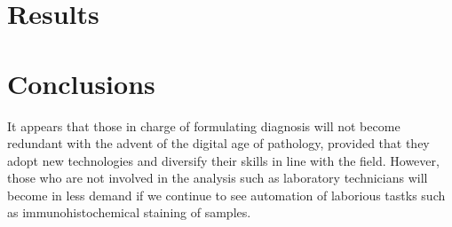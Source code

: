 \documentclass[12pt]{article}
\begin{document}
\section{Results}\label{results}

\section{Conclusions}\label{conclusions}

It appears that those in charge of formulating diagnosis will not become redundant with the advent of the digital age 
of pathology, provided that they adopt new technologies and diversify their skills in line with the field. However, those 
who are not involved in the analysis such as laboratory technicians will become in less demand if we continue to see 
automation of laborious tastks such as immunohistochemical staining of samples.

\printbibliography
\end{document}
